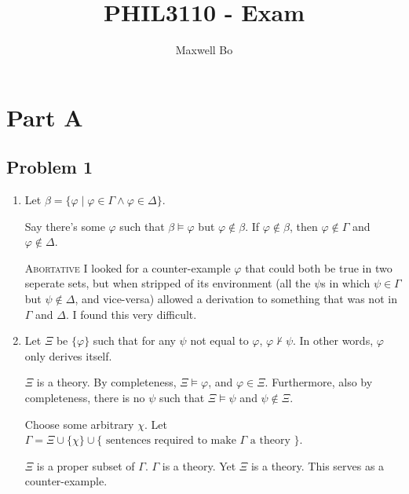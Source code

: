 \documentclass[a4paper]{article}
\title{PHIL3110 - Exam}
\author{Maxwell Bo}
\newcommand{\SET}[1]{\{ {#1} \}}
\begin{document}
 

\maketitle

\section*{Part A}

\subsection*{Problem 1}

\begin{enumerate}

    \item

Let $\beta = \SET{ \varphi \mid \varphi \in \Gamma \wedge \varphi \in \Delta }$.

Say there's some $\varphi$ such that $\beta \models \varphi$ but $\varphi \not\in \beta$. If $\varphi \not\in \beta$, then $\varphi \not\in \Gamma$ and $\varphi \not\in \Delta$.

    \textsc{Abortative} I  looked for a counter-example $\varphi$ that could both be true in two seperate sets, but when stripped of its environment (all the $\psi$s in which $\psi \in \Gamma$ but $\psi \not\in \Delta$, and vice-versa) allowed a derivation to something that was not in $\Gamma$ and $\Delta$. I found this very difficult.


    \item Let $\Xi$ be $\SET{\varphi}$ such that for any $\psi$ not equal to $\varphi$, $\varphi \not\vdash \psi$. In other words, $\varphi$ only derives itself.

    $\Xi$ is a theory. By completeness, $\Xi \models \varphi$, and $\varphi \in \Xi$. Furthermore, also by completeness, there is no $\psi$ such that $\Xi \models \psi$ and $\psi \not\in \Xi$.

    Choose some arbitrary $\chi$. Let $\Gamma = \Xi \cup \SET{\chi} \cup \SET{\text{ sentences required to make } \Gamma \text{ a theory }}$.

    $\Xi$ is a proper subset of $\Gamma$. $\Gamma$ is a theory. Yet $\Xi$ is a theory. This serves as a counter-example.


\end{enumerate}
\end{document}
